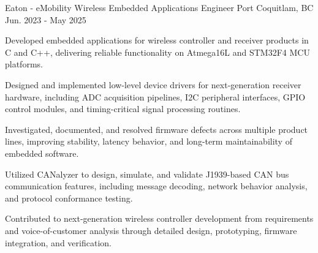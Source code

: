\begin{cventries}
    \cventry
    {Eaton - eMobility Wireless} %
    {Embedded Applications Engineer} %
    {Port Coquitlam, BC} %
    {Jun. 2023 - May 2025} %
    { %
        \begin{cvitems}
        \item {Developed embedded applications for wireless controller and receiver products in C and C++, delivering reliable functionality on Atmega16L and STM32F4 MCU platforms.}
        \item {Designed and implemented low-level device drivers for next-generation receiver hardware, including ADC acquisition pipelines, I2C peripheral interfaces, GPIO control modules, and timing-critical signal processing routines.}
        \item {Investigated, documented, and resolved firmware defects across multiple product lines, improving stability, latency behavior, and long-term maintainability of embedded software.}
        \item {Utilized CANalyzer to design, simulate, and validate J1939-based CAN bus communication features, including message decoding, network behavior analysis, and protocol conformance testing.}
        \item {Contributed to next-generation wireless controller development from requirements and voice-of-customer analysis through detailed design, prototyping, firmware integration, and verification.}
        \end{cvitems}
        \vspace{3mm}
    \vspace{1mm}
    }


\end{cventries}
